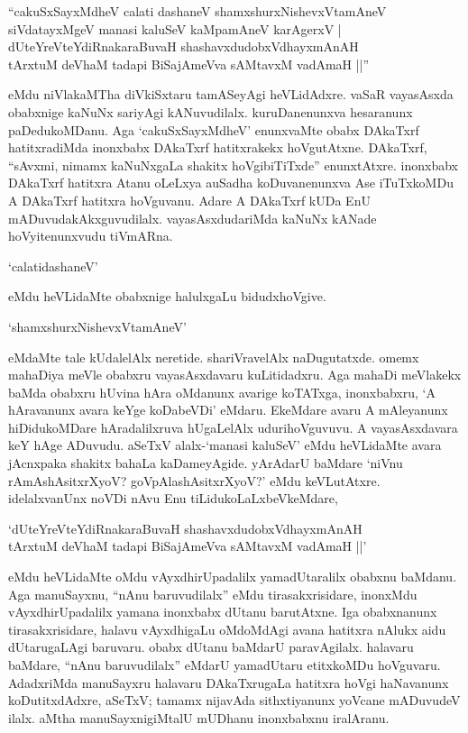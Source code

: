 \begin{shloka}
``cakuSxSayxMdheV calati dashaneV shamxshurxNishevxVtamAneV\\
siVdatayxMgeV manasi kaluSeV kaMpamAneV karAgerxV |\\
dUteYreVteYdiRnakaraBuvaH shashavxdudobxVdhayxmAnAH\\
tArxtuM deVhaM tadapi BiSajAmeVva sAMtavxM vadAmaH ||''
\end{shloka}

\noindent eMdu niVlakaMTha diVkiSxtaru tamASeyAgi heVLidAdxre. {} vaSaR vayasAsxda obabxnige kaNuNx sariyAgi kANuvudilalx. kuruDanenunxva hesaranunx paDedukoMDanu. Aga `cakuSxSayxMdheV' enunxvaMte obabx DAkaTxrf hatitxradiMda inonxbabx DAkaTxrf hatitxrakekx hoVgutAtxne. DAkaTxrf, ``sAvxmi, nimamx kaNuNxgaLa shakitx hoVgibiTiTxde'' enunxtAtxre. inonxbabx DAkaTxrf hatitxra Atanu oLeLxya auSadha koDuvanenunxva Ase iTuTxkoMDu A DAkaTxrf hatitxra hoVguvanu. Adare A DAkaTxrf kUDa EnU mADuvudakAkxguvudilalx. vayasAsxdudariMda kaNuNx kANade hoVyitenunxvudu tiVmARna.

`calatidashaneV'

eMdu heVLidaMte obabxnige halulxgaLu bidudxhoVgive.

\begin{shloka}
`shamxshurxNishevxVtamAneV'
\end{shloka}

\noindent eMdaMte tale kUdalelAlx neretide. shariVravelAlx naDugutatxde. omemx mahaDiya meVle obabxru vayasAsxdavaru kuLitidadxru. Aga mahaDi meVlakekx baMda obabxru hUvina hAra oMdanunx avarige koTATxga, inonxbabxru, `A hAravanunx avara keYge koDabeVDi' eMdaru. EkeMdare avaru A mAleyanunx hiDidukoMDare hAradalilxruva hUgaLelAlx udurihoVguvuvu. A vayasAsxdavara keY hAge ADuvudu. aSeTxV alalx-`manasi kaluSeV' eMdu heVLidaMte avara jAcnxpaka shakitx bahaLa kaDameyAgide. yArAdarU baMdare `niVnu rAmAshAsitxrXyoV? goVpAlashAsitxrXyoV?' eMdu keVLutAtxre. idelalxvanUnx noVDi nAvu Enu tiLidukoLaLxbeVkeMdare,

\begin{shloka}
`dUteYreVteYdiRnakaraBuvaH shashavxdudobxVdhayxmAnAH\\
tArxtuM deVhaM tadapi BiSajAmeVva sAMtavxM vadAmaH ||'
\end{shloka}

\noindent eMdu heVLidaMte oMdu vAyxdhirUpadalilx yamadUtaralilx obabxnu baMdanu. Aga manuSayxnu, ``nAnu baruvudilalx'' eMdu tirasakxrisidare, inonxMdu vAyxdhirUpadalilx yamana inonxbabx dUtanu barutAtxne. Iga obabxnanunx tirasakxrisidare, halavu vAyxdhigaLu oMdoMdAgi avana hatitxra nAlukx aidu dUtarugaLAgi baruvaru. obabx dUtanu baMdarU paravAgilalx. halavaru baMdare, ``nAnu baruvudilalx'' eMdarU yamadUtaru etitxkoMDu hoVguvaru. AdadxriMda manuSayxru halavaru DAkaTxrugaLa hatitxra hoVgi haNavanunx koDutitxdAdxre, aSeTxV; tamamx nijavAda sithxtiyanunx yoVcane mADuvudeV ilalx. aMtha manuSayxnigiMtalU mUDhanu inonxbabxnu iralAranu.

